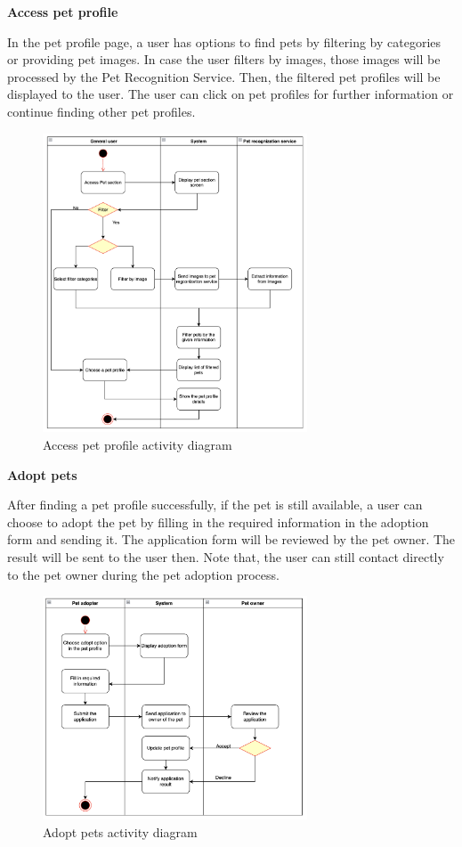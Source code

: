 \textbf{Access pet profile}

In the pet profile page, a user has options to find pets by filtering by categories or providing pet images. In case the user filters by images, those images will be processed by the Pet Recognition Service. Then, the filtered pet profiles will be displayed to the user. The user can click on pet profiles for further information or continue finding other pet profiles.

\begin{figure}[H]
  \centering
  \includegraphics[width=0.7\textwidth]{Figures/access_pet.png}
  \caption{Access pet profile activity diagram}
  \label{fig:access-pet}
\end{figure}

\textbf{Adopt pets}

After finding a pet profile successfully, if the pet is still available, a user can choose to adopt the pet by filling in the required information in the adoption form and sending it. The application form will be reviewed by the pet owner. The result will be sent to the user then. Note that, the user can still contact directly to the pet owner during the pet adoption process.

\begin{figure}[H]
  \centering
  \includegraphics[width=0.7\textwidth]{Figures/adopt_pet.png}
  \caption{Adopt pets activity diagram}
  \label{fig:adopt-pet}
\end{figure}

